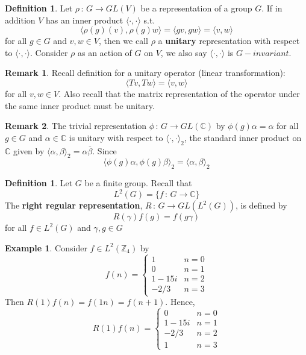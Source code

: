 \documentclass{book}
\newcommand{\Z}{\mathbb{Z}}
\newcommand{\C}{\mathbb{C}}
\newcommand{\define}[1]{\textbf{#1}}
\newcommand{\inner}[1]{\langle #1 \rangle}
\theoremstyle{definition}
\newtheorem{definition}[lemma]{Definition}
\theoremstyle{remarkstyle}
\newtheorem*{remark}{Remark}%
\newtheorem*{example}{Example}%
\begin{document}
\begin{definition}
    Let $\rho \,:\, G\rightarrow GL(V)$ be a representation of a group $G$. If in addition $V$ has an inner product $\inner{\cdot,\cdot}$ s.t. 
    $$
    \inner{\rho(g)(v), \rho(g)w } = \inner{gv,gw} = \inner{v,w}
    $$
    for all $g\in G$ and $v,w\in V$, then we call $\rho$ a \define{unitary} representation with respect to $\inner{\cdot,\cdot}$. Consider $\rho$ as an action of $G$ on $V$, we also say $\inner{\cdot,\cdot}$ is $G-invariant$.
\end{definition}
\begin{remark}
    Recall definition for a unitary operator (linear transformation):
    $$
    \inner{Tv, Tw} = \inner{v,w}
    $$
    for all $v,w\in V$. Also recall that the matrix representation of the operator under the same inner product must be unitary.
\end{remark}
\begin{remark}
    The trivial representation $\phi\,:\,G\rightarrow GL(\C)$ by $\phi(g)\alpha=\alpha$ for all $g\in G$ and $\alpha\in \C$ is unitary with respect to $\inner{\cdot,\cdot}_2$, the standard inner product on $\C$ given by $\inner{\alpha,\beta}_2=\alpha\overline{\beta}$. Since 
    $$
    \inner{\phi(g)\alpha,\phi(g)\beta}_2 = \inner{\alpha,\beta}_2
    $$
    \newline
\end{remark}

\begin{definition}
    Let $G$ be a finite group. Recall that
    $$
    L^2(G) = \{f\,:\,G\rightarrow\C\}
    $$
    The \define{right regular representation}, $R\,:\, G\rightarrow GL(L^2(G)) $, is defined by 
    $$
    R(\gamma)f(g) = f(g\gamma)
    $$
    for all $f\in L^2(G)$ and $\gamma,g\in G$
\end{definition}
\begin{example}
    Consider $f\in L^2(\Z_4)$ by 
    $$
    f(n) = \left\{ 
    \begin{array}{ll}
         1 & n = 0 \\
         0 & n = 1 \\
         1-15i & n = 2 \\
         -2/3 & n = 3
    \end{array}
    \right.
    $$
    Then $R(1)f(n) = f(1n) = f(n+1) $. Hence, 
        $$
    R(1)f(n) = \left\{ 
    \begin{array}{ll}
         0 & n = 0 \\
         1-15i & n = 1 \\
         -2/3 & n = 2 \\
         1 & n = 3
    \end{array}
    \right.
    $$
    \newline
\end{example}
\end{document}
